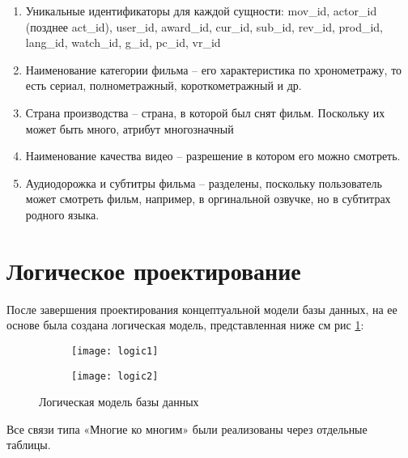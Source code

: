 \begin{enumerate}
\item Уникальные идентификаторы для каждой сущности: mov\_id, actor\_id (позднее act\_id), user\_id, award\_id,
cur\_id, sub\_id, rev\_id, prod\_id, lang\_id, watch\_id, g\_id, pc\_id, vr\_id
\item Наименование категории фильма -- его характеристика по хронометражу, то есть сериал, полнометражный, короткометражный и др.
\item Страна производства -- страна, в которой был снят фильм. Поскольку их может быть много, атрибут многозначный
\item Наименование качества видео -- разрешение в котором его можно смотреть.
\item Аудиодорожка и субтитры фильма -- разделены, поскольку пользователь может смотреть фильм, например, в оргинальной озвучке,
    но в субтитрах родного языка.
\end{enumerate}

\section{Логическое проектирование}
После завершения проектирования концептуальной модели базы данных, на ее основе была создана логическая модель,
представленная ниже {см рис \ref{logic}}:

\begin{figure}
    \begin{subfigure}{.4\linewidth}
    \texttt{[image: logic1]}
    \end{subfigure}

    \begin{subfigure}{.5\linewidth}
    \texttt{[image: logic2]}
    \end{subfigure}

    \caption{Логическая модель базы данных}
    \label{logic}
\end{figure}

Все связи типа «Многие ко многим» были реализованы через отдельные таблицы.
\newpage

